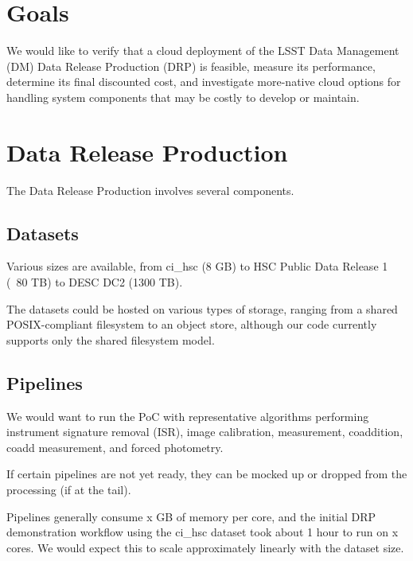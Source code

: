 \section{Goals} \label{sec:goals}
We would like to verify that a cloud deployment of the LSST Data Management (DM) Data Release Production (DRP) is feasible, measure its performance, determine its final discounted cost, and investigate more-native cloud options for handling system components that may be costly to develop or maintain.

\section{Data Release Production} \label{sec:drp}
The Data Release Production involves several components.

\subsection{Datasets} \label{sec:drp-datasets}
Various sizes are available, from ci\_hsc (8 GB) to HSC Public Data Release 1 (~80 TB) to DESC DC2 (1300 TB).

The datasets could be hosted on various types of storage, ranging from a shared POSIX-compliant filesystem to an object store, although our code currently supports only the shared filesystem model.

\subsection{Pipelines} \label{sec:drp-pipelines}
We would want to run the PoC with representative algorithms performing instrument signature removal (ISR), image calibration, measurement, coaddition, coadd measurement, and forced photometry.

If certain pipelines are not yet ready, they can be mocked up or dropped from the processing (if at the tail).

Pipelines generally consume x GB of memory per core, and the initial DRP demonstration workflow using the ci\_hsc dataset took about 1 hour to run on x cores. We would expect this to scale approximately linearly with the dataset size.

